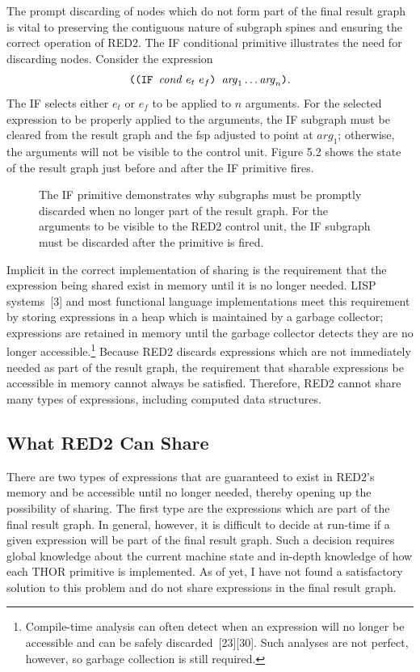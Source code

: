 The prompt discarding of nodes which do not form part of the final result graph
is vital to preserving the contiguous nature of subgraph spines and ensuring the
correct operation of RED2. The IF conditional primitive illustrates the need for
discarding nodes. Consider the expression
\[
\THOR{((IF }\mathit{cond}\ e_t\ e_f\THOR{) }\mathit{arg}_1\ldots \mathit{arg}_n\THOR{)}.
\]
The IF selects either \(e_t\) or \(e_f\) to be applied to \(n\) arguments. For
the selected expression to be properly applied to the arguments, the IF subgraph
must be cleared from the result graph and the fsp adjusted to point at
\(\mathit{arg}_1\); otherwise, the arguments will not be visible to the control unit.
Figure 5.2 shows the state of the result graph just before and after the IF
primitive fires.

\begin{figure}[htbp]
\centering

\caption[Discarding subgraphs]{The IF primitive demonstrates why subgraphs must be promptly
discarded when no longer part of the result graph. For the arguments to be
visible to the RED2 control unit, the IF subgraph must be discarded after the
primitive is fired.}
\end{figure}

Implicit in the correct implementation of sharing is the requirement that the
expression being shared exist in memory until it is no longer needed. LISP
systems~[3] and most functional language implementations meet this requirement
by storing expressions in a heap which is maintained by a garbage collector;
expressions are retained in memory until the garbage collector detects they are
no longer accessible.\footnote{Compile-time analysis can often detect when an
expression will no longer be accessible and can be safely discarded~[23][30].
Such analyses are not perfect, however, so garbage collection is still
required.} Because RED2 discards expressions which are not immediately needed as
part of the result graph, the requirement that sharable expressions be
accessible in memory cannot always be satisfied. Therefore, RED2 cannot share
many types of expressions, including computed data structures.

\subsection{What RED2 Can Share}

There are two types of expressions that are guaranteed to exist in RED2's memory
and be accessible until no longer needed, thereby opening up the possibility of
sharing. The first type are the expressions which are part of the final result
graph. In general, however, it is difficult to decide at run-time if a given
expression will be part of the final result graph. Such a decision requires
global knowledge about the current machine state and in-depth knowledge of how
each THOR primitive is implemented. As of yet, I have not found a satisfactory
solution to this problem and do not share expressions in the final result graph.


